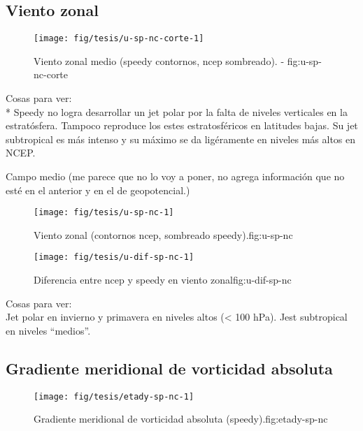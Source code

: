 \documentclass[spanish,a4paper]{book}
\begin{document}
\subsection{Viento zonal}\label{viento-zonal-1}

\begin{figure}

{\centering \texttt{[image: fig/tesis/u-sp-nc-corte-1]} 

}

\caption{Viento zonal medio (speedy contornos, ncep sombreado). - fig:u-sp-nc-corte}\label{fig:u-sp-nc-corte}
\end{figure}

Cosas para ver:\\
* Speedy no logra desarrollar un jet polar por la falta de niveles
verticales en la estratósfera. Tampoco reproduce los estes
estratosféricos en latitudes bajas. Su jet subtropical es más intenso y
su máximo se da ligéramente en niveles más altos en NCEP.

Campo medio (me parece que no lo voy a poner, no agrega información que
no esté en el anterior y en el de geopotencial.)

\begin{figure}

{\centering \texttt{[image: fig/tesis/u-sp-nc-1]} 

}

\caption{Viento zonal (contornos ncep, sombreado speedy).{fig:u-sp-nc}}\label{fig:u-sp-nc}
\end{figure}

\begin{figure}
\texttt{[image: fig/tesis/u-dif-sp-nc-1]} \caption{Diferencia entre ncep y speedy en viento zonal{fig:u-dif-sp-nc}}\label{fig:u-dif-sp-nc}
\end{figure}

Cosas para ver:\\
Jet polar en invierno y primavera en niveles altos (\textless{} 100
hPa). Jest subtropical en niveles ``medios''.

\subsection{Gradiente meridional de vorticidad
absoluta}\label{gradiente-meridional-de-vorticidad-absoluta-1}

\begin{figure}

{\centering \texttt{[image: fig/tesis/etady-sp-nc-1]} 

}

\caption{Gradiente meridional de vorticidad absoluta (speedy).{fig:etady-sp-nc}}\label{fig:etady-sp-nc}
\end{figure}
\end{document}
